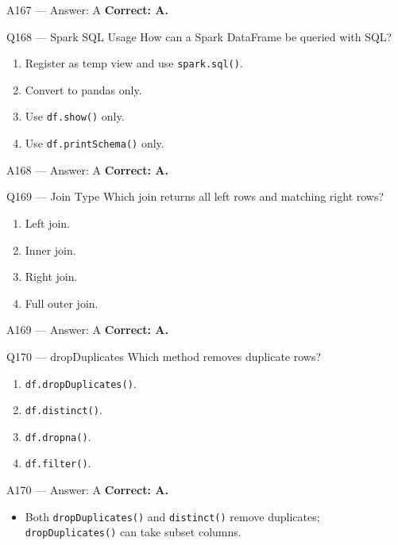 \documentclass[aspectratio=169,9pt]{beamer}
\begin{document}
	\begin{frame}{A167 --- Answer: A}
		\textbf{Correct: A.}
	\end{frame}
	
	\begin{frame}{Q168 --- Spark SQL Usage}
		How can a Spark DataFrame be queried with SQL?
		\begin{enumerate}[label=\Alph*.]
			\item Register as temp view and use \texttt{spark.sql()}.
			\item Convert to pandas only.
			\item Use \texttt{df.show()} only.
			\item Use \texttt{df.printSchema()} only.
		\end{enumerate}
	\end{frame}
	
	\begin{frame}{A168 --- Answer: A}
		\textbf{Correct: A.}
	\end{frame}
	
	\begin{frame}{Q169 --- Join Type}
		Which join returns all left rows and matching right rows?
		\begin{enumerate}[label=\Alph*.]
			\item Left join.
			\item Inner join.
			\item Right join.
			\item Full outer join.
		\end{enumerate}
	\end{frame}
	
	\begin{frame}{A169 --- Answer: A}
		\textbf{Correct: A.}
	\end{frame}
	
	\begin{frame}{Q170 --- dropDuplicates}
		Which method removes duplicate rows?
		\begin{enumerate}[label=\Alph*.]
			\item \texttt{df.dropDuplicates()}.
			\item \texttt{df.distinct()}.
			\item \texttt{df.dropna()}.
			\item \texttt{df.filter()}.
		\end{enumerate}
	\end{frame}
	
	\begin{frame}{A170 --- Answer: A}
		\textbf{Correct: A.}
		\begin{itemize}
			\item Both \texttt{dropDuplicates()} and \texttt{distinct()} remove duplicates; \texttt{dropDuplicates()} can take subset columns.
		\end{itemize}
	\end{frame}
	
\end{document}
